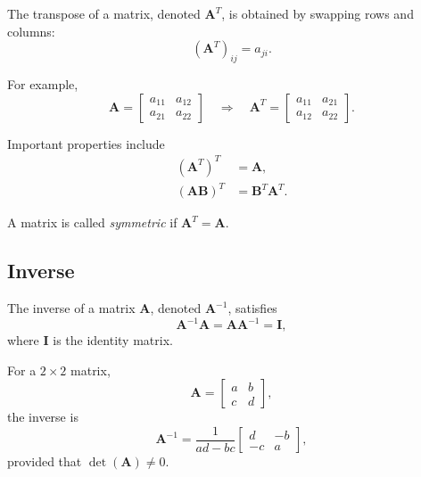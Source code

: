 The transpose of a matrix, denoted $\mathbf{A}^T$, is obtained by swapping rows
and columns:
\begin{equation}
    (\mathbf{A}^T)_{ij} = a_{ji}.
\end{equation}

For example,
\begin{equation}
    \mathbf{A} =
    \begin{bmatrix}
        a_{11} & a_{12} \\
        a_{21} & a_{22}
    \end{bmatrix}
    \quad \Rightarrow \quad
    \mathbf{A}^T =
    \begin{bmatrix}
        a_{11} & a_{21} \\
        a_{12} & a_{22}
    \end{bmatrix}.
\end{equation}

Important properties include
\begin{align}
    (\mathbf{A}^T)^T &= \mathbf{A}, \\
    (\mathbf{A}\mathbf{B})^T &= \mathbf{B}^T \mathbf{A}^T.
\end{align}

A matrix is called \emph{symmetric} if $\mathbf{A}^T = \mathbf{A}$.

\subsection{Inverse}

The inverse of a matrix $\mathbf{A}$, denoted $\mathbf{A}^{-1}$, satisfies
\begin{equation}
    \mathbf{A}^{-1} \mathbf{A} = \mathbf{A} \mathbf{A}^{-1} = \mathbf{I},
\end{equation}
where $\mathbf{I}$ is the identity matrix.

For a $2\times2$ matrix,
\begin{equation}
    \mathbf{A} =
    \begin{bmatrix}
        a & b \\
        c & d
    \end{bmatrix},
\end{equation}
the inverse is
\begin{equation}
    \mathbf{A}^{-1}
    =
    \frac{1}{ad - bc}
    \begin{bmatrix}
        d & -b \\
        -c & a
    \end{bmatrix},
\end{equation}
provided that $\det(\mathbf{A}) \neq 0$.

